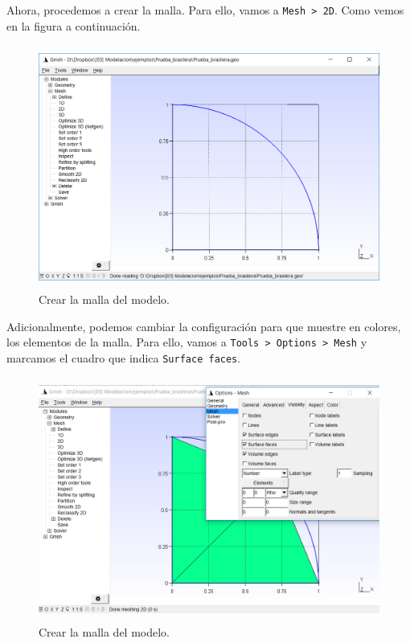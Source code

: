 \documentclass[12pt,letterpaper]{article}
\begin{document}
Ahora, procedemos a crear la malla. Para ello,  vamos a \texttt{Mesh > 2D}.  Como vemos en la figura a continuación.
\begin{figure}[H]
    \centering
    \includegraphics[height=8cm]{img/Mallar_2D.png} 
    \caption{Crear la malla del modelo.}
\end{figure}

Adicionalmente, podemos cambiar la configuración para que muestre en colores, los elementos de la malla. Para ello, vamos a \texttt{Tools > Options > Mesh} y marcamos el cuadro que indica \texttt{Surface faces}.
\begin{figure}[H]
    \centering
    \includegraphics[height=8cm]{img/Ver_superficie_malla.png} 
    \caption{Crear la malla del modelo.}
\end{figure}
\end{document}
